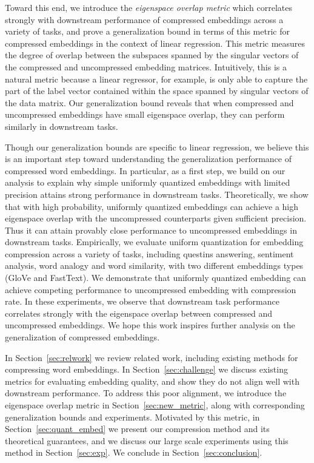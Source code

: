 Toward this end, we introduce the \textit{eigenspace overlap metric} which correlates strongly with downstream performance of compressed embeddings across a variety of tasks, and prove a generalization bound in terms of this metric for compressed embeddings in the context of linear regression. 
This metric measures the degree of overlap between the subspaces spanned by the singular vectors of the compressed and uncompressed embedding matrices. 
Intuitively, this is a natural metric because a linear regressor, for example, is only able to capture the part of the label vector contained within the space spanned by singular vectors of the data matrix. Our generalization bound reveals that when compressed and uncompressed embeddings have small eigenspace overlap, they can perform similarly in downstream tasks. 


Though our generalization bounds are specific to linear regression, we believe this is an important step toward understanding the generalization performance of compressed word embeddings. In particular, as a first step, we build on our analysis to explain why simple uniformly quantized embeddings with limited precision attains strong performance in downstream tasks. Theoretically, we show that with high probability, uniformly quantized embeddings can achieve a high eigenspace overlap with the uncompressed counterparts given sufficient precision. Thus it can attain provably close performance to uncompressed embeddings in downstream tasks. Empirically, we evaluate uniform quantization for embedding compression  across a variety of tasks, including questins answering, sentiment analysis, word analogy and word similarity, with two different embeddings types (GloVe and FastText). We demonstrate that uniformly quantized embedding can achieve competing performance to uncompressed embedding with  compression rate. In these experiments, we observe that downstream task performance correlates strongly with the eigenspace overlap between compressed and uncompressed embeddings.
We hope this work inspires further analysis on the generalization of compressed embeddings.

In Section~\ref{sec:relwork} we review related work, including existing methods for compressing word embeddings.
In Section~\ref{sec:challenge} we discuss existing metrics for evaluating embedding quality, and show they do not align well with downstream performance.
To address this poor alignment, we introduce the eigenspace overlap metric in Section~\ref{sec:new_metric}, along with corresponding generalization bounds and experiments.
Motivated by this metric, in Section~\ref{sec:quant_embed} we present our compression method and its theoretical guarantees, and we discuss our large scale experiments using this method in Section~\ref{sec:exp}.
We conclude in Section~\ref{sec:conclusion}.


